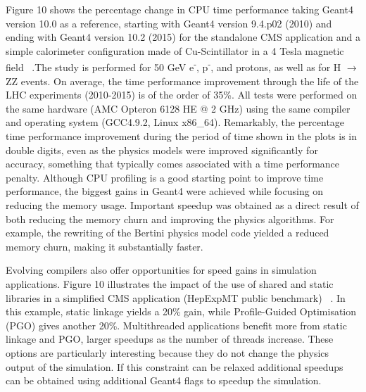\documentclass[12pt,a4paper]{article}
\begin{document}
{Figure 10 shows the percentage change in CPU time performance taking
Geant4 version 10.0 as a reference, starting with Geant4 version 9.4.p02
(2010) and ending with Geant4 version 10.2 (2015) for the standalone CMS
application and a simple calorimeter configuration made of
Cu-Scintillator in a 4 Tesla magnetic field ~\cite{G4CPUPerf}.The study is
performed for 50 GeV e\textsuperscript{-}, p\textsuperscript{-}, and
protons, as well as for H $\rightarrow$ ZZ events. On average, the time performance
improvement through the life of the LHC experiments (2010-2015) is of
the order of 35\%. All tests were performed on the same hardware (AMC
Opteron 6128 HE @ 2 GHz) using the same compiler and operating system
(GCC4.9.2, Linux x86\_64). Remarkably, the percentage time performance
improvement during the period of time shown in the plots is in double
digits, even as the physics models were improved significantly for
accuracy, something that typically comes associated with a time
performance penalty. Although CPU profiling is a good starting point to
improve time performance, the biggest gains in Geant4 were achieved
while focusing on reducing the memory usage. Important speedup was
obtained as a direct result of both reducing the memory churn and
improving the physics algorithms. For example, the rewriting of the
Bertini physics model code yielded a reduced memory churn, making it
substantially faster.

Evolving compilers also offer opportunities for speed gains in
simulation applications. Figure 10 illustrates the impact of the use of
shared and static libraries in a simplified CMS application (HepExpMT
public benchmark) ~\cite{Farrell:2016ovs}. In this example, static linkage yields a
20\% gain, while Profile-Guided Optimisation (PGO) gives another 20\%.
Multithreaded applications benefit more from static linkage and PGO,
larger speedups as the number of threads increase. These options are
particularly interesting because they do not change the physics output
of the simulation. If this constraint can be relaxed additional speedups
can be obtained using additional Geant4 flags to speedup the simulation.

}
\end{document}
